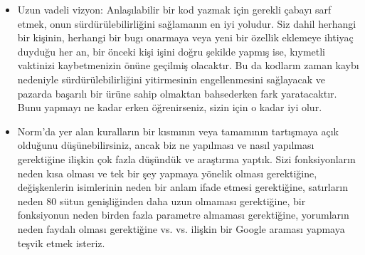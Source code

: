 \documentclass{42-en}
\begin{document}
\begin{itemize}
    \item Uzun vadeli vizyon: Anlaşılabilir bir kod yazmak için gerekli çabayı sarf etmek,
        onun sürdürülebilirliğini sağlamanın en iyi yoludur. Siz dahil herhangi bir kişinin,
        herhangi bir bugı onarmaya veya yeni bir özellik eklemeye ihtiyaç duyduğu her an,
        bir önceki kişi işini doğru şekilde yapmış ise, kıymetli vaktinizi kaybetmenizin
        önüne geçilmiş olacaktır. Bu da kodların zaman kaybı nedeniyle sürdürülebilirliğini
        yitirmesinin engellenmesini sağlayacak ve pazarda başarılı bir ürüne sahip olmaktan
        bahsederken fark yaratacaktır. Bunu yapmayı ne kadar erken öğrenirseniz, sizin için o
        kadar iyi olur.

    \item Norm’da yer alan kuralların bir kısmının veya tamamının tartışmaya açık olduğunu
        düşünebilirsiniz, ancak biz ne yapılması ve nasıl yapılması gerektiğine ilişkin çok
        fazla düşündük ve araştırma yaptık. Sizi fonksiyonların neden kısa olması ve tek bir
        şey yapmaya yönelik olması gerektiğine, değişkenlerin isimlerinin neden bir anlam
        ifade etmesi gerektiğine, satırların neden 80 sütun genişliğinden daha uzun olmaması
        gerektiğine, bir fonksiyonun neden birden fazla parametre almaması gerektiğine,
        yorumların neden faydalı olması gerektiğine vs. vs. ilişkin bir Google araması
        yapmaya teşvik etmek isteriz.

    \end{itemize}
\end{document}
